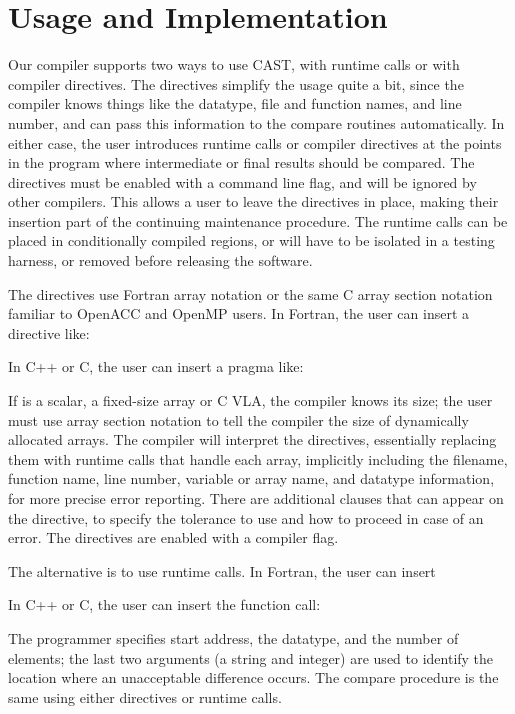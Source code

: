 \section{Usage and Implementation}

Our compiler supports two ways to use CAST, with runtime calls or with compiler directives.
The directives simplify the usage quite a bit, since the compiler knows things like the datatype, file and function names, and line number, and can pass this information to the compare routines automatically.
In either case, the user introduces runtime calls or compiler directives at the points in the program where intermediate or final results should be compared.
The directives must be enabled with a command line flag, and will be ignored by other compilers.
This allows a user to leave the directives in place, making their insertion part of the continuing maintenance procedure.
The runtime calls can be placed in conditionally compiled regions, or will have to be isolated in a testing harness, or removed before releasing the software.

The directives use Fortran array notation or the same C array section notation familiar to OpenACC and OpenMP users.
In Fortran, the user can insert a directive like:
\begin{otabbing}
\>
\end{otabbing}
In C++ or C, the user can insert a pragma like:
\begin{otabbing}
\>
\end{otabbing}
If  is a scalar, a fixed-size array or C VLA, the compiler knows its size; the user must use array section notation to tell the compiler the size of dynamically allocated arrays.
The compiler will interpret the directives, essentially replacing them with runtime calls that handle each array, implicitly including the filename, function name, line number, variable or array name, and datatype information, for more precise error reporting.
There are additional clauses that can appear on the directive, to specify the tolerance to use and how to proceed in case of an error.
The directives are enabled with a compiler flag.

The alternative is to use runtime calls.
In Fortran, the user can insert
\begin{otabbing}
\>
\end{otabbing}
In C++ or C, the user can insert the function call:
\begin{otabbing}
\>
\end{otabbing}
The programmer specifies start address, the datatype, and the number of elements;
the last two arguments (a string and integer) are used to identify the location where an unacceptable difference occurs.
The compare procedure is the same using either directives or runtime calls.

